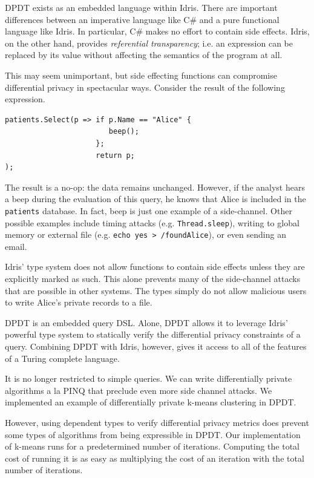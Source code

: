 \documentclass[12pt]{article}
\begin{document}
DPDT exists as an embedded language within Idris.
There are important differences between an imperative language like C\# and a pure functional language like Idris.
In particular, C\# makes no effort to contain side effects.
Idris, on the other hand, provides \textit{referential transparency}; i.e. an expression can be replaced by its value without affecting the semantics of the program at all.

This may seem unimportant, but side effecting functions can compromise differential privacy in spectacular ways.
Consider the result of the following expression.

\begin{lstlisting}[caption={Example side-channel attack}]
patients.Select(p => if p.Name == "Alice" {
                        beep();
                     };
                     return p;
);
\end{lstlisting}

The result is a no-op: the data remains unchanged.
However, if the analyst hears a beep during the evaluation of this query, he knows that Alice is included in the \texttt{patients} database.
In fact, beep is just one example of a side-channel.
Other possible examples include timing attacks (e.g. \texttt{Thread.sleep}), writing to global memory or external file (e.g. \texttt{echo yes > /foundAlice}), or even sending an email.

Idris' type system does not allow functions to contain side effects unless they are explicitly marked as such.
This alone prevents many of the side-channel attacks that are possible in other systems.
The types simply do not allow malicious users to write Alice's private records to a file.

DPDT is an embedded query DSL.
Alone, DPDT allows it to leverage Idris' powerful type system to statically verify the differential privacy constraints of a query.
Combining DPDT with Idris, however, gives it access to all of the features of a Turing complete language.

It is no longer restricted to simple queries.
We can write differentially private algorithms a la PINQ that preclude even more side channel attacks.
We implemented an example of differentially private k-means clustering in DPDT.

However, using dependent types to verify differential privacy metrics does prevent some types of algorithms from being expressible in DPDT.
Our implementation of k-means runs for a predetermined number of iterations.
Computing the total cost of running it is as easy as multiplying the cost of an iteration with the total number of iterations.
\end{document}
